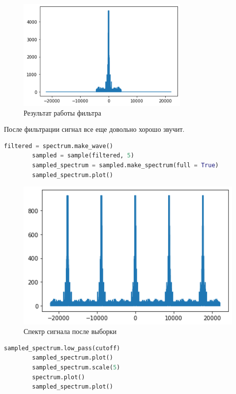 \documentclass[a4paper, 12pt]{report}
\begin{document}
	\begin{figure}[H]
		\centering
		\includegraphics[width=0.75\textwidth]{task3.png}
		\caption{Результат работы фильтра}
		\label{fig:task3}
	\end{figure}
	После фильтрации сигнал все еще довольно хорошо звучит.
	\begin{lstlisting}[language=Python,caption=Выборка]
		filtered = spectrum.make_wave()
		sampled = sample(filtered, 5)
		sampled_spectrum = sampled.make_spectrum(full = True)
		sampled_spectrum.plot()
	\end{lstlisting}
	\begin{figure}[H]
		\centering
		\includegraphics[width=1.0\textwidth]{task4.png}
		\caption{Спектр сигнала после выборки}
		\label{fig:task4}
	\end{figure}
	\begin{lstlisting}[language=Python,caption=Строим спектр полученного сигнала]
		sampled_spectrum.low_pass(cutoff)
		sampled_spectrum.plot()
		sampled_spectrum.scale(5)
		spectrum.plot()
		sampled_spectrum.plot()
	\end{lstlisting}
\end{document}

